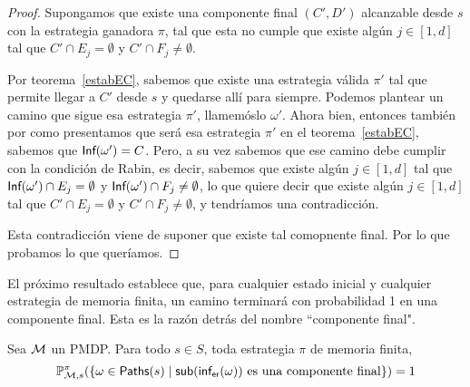 \begin{proof}
	Supongamos que existe una componente final $(C', D')$ alcanzable desde $s$ con la estrategia ganadora $\pi$, tal que esta no cumple que existe algún $j \in [1, d]$ tal que $C' \cap E_j= \emptyset$ y $C' \cap F_j \neq \emptyset$.

	Por teorema~\ref{estabEC}, sabemos que existe una estrategia válida $\pi'$ tal
	que permite llegar a $C'$ desde $s$ y quedarse allí para siempre. Podemos
	plantear un camino que sigue esa estrategia $\pi'$, llamemóslo $\omega'$. Ahora
	bien, entonces también por como presentamos que será esa estrategia $\pi'$ en
	el teorema~\ref{estabEC}, sabemos que $\textsf{Inf}(\omega') = C$. Pero, a su vez
	sabemos que ese camino debe cumplir con la condición de Rabin, es decir,
	sabemos que existe algún $j \in [1, d]$ tal que $\textsf{Inf}(\omega') \cap E_j =
		\emptyset$ y $\textsf{Inf}(\omega') \cap F_j \neq \emptyset$, lo que quiere decir que
	existe algún $j \in [1, d]$ tal que $C' \cap E_j= \emptyset$ y $C' \cap F_j
		\neq \emptyset$, y tendríamos una contradicción.

	Esta contradicción viene de suponer que existe tal comopnente final. Por lo que
	probamos lo que queríamos.
\end{proof}

El próximo resultado establece que, para cualquier estado inicial y cualquier
estrategia de memoria finita, un camino terminará con probabilidad 1 en una
componente final. Esta es la razón detrás del nombre ``componente final".

\begin{theorem} \label{teoFundEC}
	Sea $\mathcal{M}$ un PMDP. Para todo $s \in S$, toda estrategia $\pi$ de memoria finita,
	$$\mathbb{P}^\pi_{\mathcal{M}, s}(\{ \omega \in \textsf{Paths}(s) \mid \textsf{sub}(\textsf{inf}_\textsf{er}(\omega)) \text{ es una componente final}\}) = 1$$
\end{theorem}


